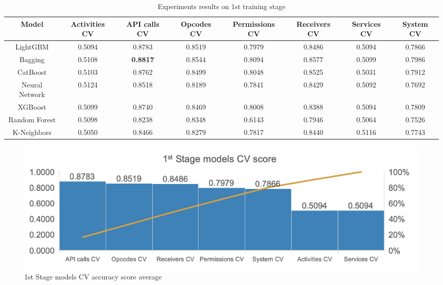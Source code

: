 \begin{table}[htbp]
    \centering
    \caption{Experiments results on 1st training stage}
    \label{table:1ststage}
    \begin{adjustbox}{width=\textwidth}
        
    \begin{tabular}{|cccccccc|}
        \hline
        
        \textbf{Model} & \textbf{Activities CV} & \textbf{API calls CV} & \textbf{Opcodes CV} & \textbf{Permissions CV} & \textbf{Receivers CV} & \textbf{Services CV} & \textbf{System CV} \\ \hline
        LightGBM & 0.5094 & 0.8783 & 0.8519 & 0.7979 & 0.8486 & 0.5094 & 0.7866 \\ \hline
        Bagging & 0.5108 & \textbf{0.8817} & 0.8544 & 0.8094 & 0.8577 & 0.5099 & 0.7986 \\ \hline
        CatBoost & 0.5103 & 0.8762 & 0.8499 & 0.8048 & 0.8525 & 0.5031 & 0.7912 \\ \hline
        Neural Network & 0.5124 & 0.8518 & 0.8189 & 0.7841 & 0.8429 & 0.5092 & 0.7692 \\ \hline
        XGBoost & 0.5099 & 0.8740 & 0.8469 & 0.8008 & 0.8388 & 0.5094 & 0.7809 \\ \hline
        Random Forest & 0.5098 & 0.8238 & 0.8348 & 0.6143 & 0.7946 & 0.5064 & 0.7526 \\ \hline
        K-Neighbors & 0.5050 & 0.8466 & 0.8279 & 0.7817 & 0.8440 & 0.5116 & 0.7743 \\ \hline
        
        \end{tabular}

    \end{adjustbox}
    \end{table}

    \begin{figure}[htbp]
        \centering
        \includegraphics[width=\textwidth]{./Figure/1ststage.png}
        \caption{1st Stage models CV accuracy score average}
        \label{fig:1ststage}
      \end{figure}

